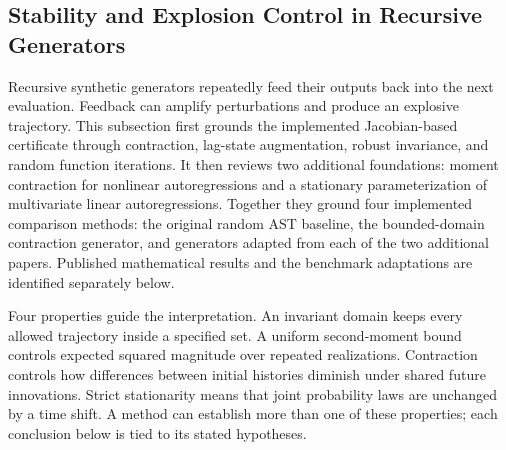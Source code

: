 \subsection{Stability and Explosion Control in Recursive Generators}
\label{sec:explosion-treatment}

Recursive synthetic generators repeatedly feed their outputs back into the
next evaluation. Feedback can amplify perturbations and produce an explosive
trajectory. This subsection first grounds the implemented Jacobian-based
certificate through contraction, lag-state augmentation, robust invariance,
and random function iterations. It then reviews two additional foundations:
moment contraction for nonlinear autoregressions and a stationary
parameterization of multivariate linear autoregressions. Together they ground
four implemented comparison methods: the original random AST baseline, the
bounded-domain contraction generator, and generators adapted from each of
the two additional papers. Published mathematical results and the
benchmark adaptations are identified separately below.

Four properties guide the interpretation. An invariant domain keeps every
allowed trajectory inside a specified set. A uniform second-moment bound
controls expected squared magnitude over repeated realizations. Contraction
controls how differences between initial histories diminish under shared
future innovations. Strict stationarity means that joint probability laws
are unchanged by a time shift. A method can establish more than one of
these properties; each conclusion below is tied to its stated hypotheses.








